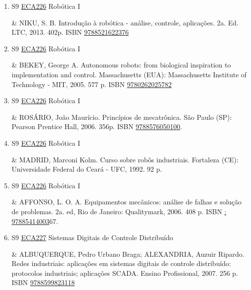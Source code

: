 \documentclass[12pt,a4paper]{book}
\begin{document}
\begin{enumerate}
&  LATHI, B.  P.  Sinais e Sistemas Lineares.  2a ed.  Porto Alegre (RS): Bookman, 2008.  856p.  ISBN \href{http://www.bn.br/site/pages/servicosProfissionais/agenciaISBN/isbnBusca/FbnBuscaISBNCatalogo.asp?pField=ISBN&pIntPagina=1&pISBN=60031139&nidbISBN=true&hidbISBN=true}{9788560031139}.
 \item S9 \hyperref[PUD:ECA226]{ECA226} Robótica I

&   NIKU, S.  B.  Introdução à robótica - análise, controle, aplicações.  2a.  Ed.  LTC, 2013.  402p.  ISBN \href{http://www.bn.br/site/pages/servicosProfissionais/agenciaISBN/isbnBusca/FbnBuscaISBNCatalogo.asp?pField=ISBN&pIntPagina=1&pISBN=21622376&nidbISBN=true&hidbISBN=true}{9788521622376}
 

 \item S9 \hyperref[PUD:ECA226]{ECA226} Robótica I

&  BEKEY, George A.  Autonomous robots: from biological inspiration to implementation and control.  Massachusetts (EUA): Massachusetts Institute of Technology - MIT, 2005.  577 p.   ISBN \href{http://www.isbnsearch.org/isbn/9780262025782}{9780262025782}
 

 \item S9 \hyperref[PUD:ECA226]{ECA226} Robótica I

& ROSÁRIO, João Maurício.  Princípios de mecatrônica.  São Paulo (SP): Pearson Prentice Hall, 2006.  356p.  ISBN \href{http://www.bn.br/site/pages/servicosProfissionais/agenciaISBN/isbnBusca/FbnBuscaISBNCatalogo.asp?pField=ISBN&pIntPagina=1&pISBN=76050100&nidbISBN=true&hidbISBN=true}{9788576050100}.
 \item S9 \hyperref[PUD:ECA226]{ECA226} Robótica I

&  MADRID, Marconi Kolm.  Curso sobre robôs industriais.  Fortaleza (CE): Universidade Federal do Ceará - UFC, 1992.  92 p. 
 

 \item S9 \hyperref[PUD:ECA226]{ECA226} Robótica I

& AFFONSO, L.  O.  A.  Equipamentos mecânicos: análise de falhas e solução de problemas.  2a.  ed, Rio de Janeiro: Qualitymark, 2006.  408 p.  ISBN \href{http://www.google.com/search?hl=pt-BR&tbo=p&tbm=bks&q=isbn:: 97885414003&num=10}{: 97885414003}67.
 \item S9 \hyperref[PUD:ECA227]{ECA227} Sistemas Digitais de Controle Distribuído

& ALBUQUERQUE, Pedro Urbano Braga;  ALEXANDRIA, Auzuir Ripardo.  Redes industriais: aplicações em sistemas digitais de controle distribuído: protocolos industriais;  aplicações SCADA.  Ensino Profissional, 2007.  256 p.   ISBN \href{http://www.bn.br/site/pages/servicosProfissionais/agenciaISBN/isbnBusca/FbnBuscaISBNCatalogo.asp?pField=ISBN&pIntPagina=1&pISBN=99823118&nidbISBN=true&hidbISBN=true}{9788599823118}
 


\end{enumerate}
\end{document}
